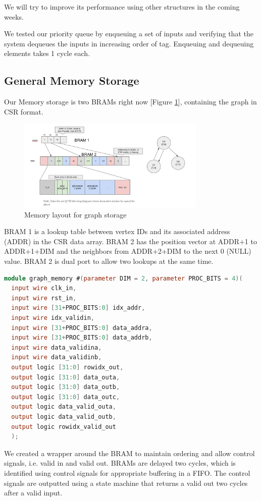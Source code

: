 \documentclass[conference]{IEEEtran}
\begin{document}
We will try to improve its performance using other structures in the coming weeks.

We tested our priority queue by enqueuing a set of inputs and verifying that the system dequeues the inputs in increasing order of tag. Enqueuing and dequeuing elements takes 1 cycle each.

\subsection{General Memory Storage}

Our Memory storage is two BRAMs right now [Figure \ref{csrfig}], containing the graph in CSR format.

\begin{figure}[htbp]
\centerline{\includegraphics[width=9cm]{csr.png}}
\caption{Memory layout for graph storage}
\label{csrfig}
\end{figure}

BRAM 1 is a lookup table between vertex IDs and its associated address (ADDR) in the CSR data array. BRAM 2 has the position vector at ADDR+1 to ADDR+1+DIM and the neighbors from ADDR+2+DIM to the next 0 (NULL) value. BRAM 2 is dual port to allow two lookups at the same time.

\begin{lstlisting}[language=Verilog]
module graph_memory #(parameter DIM = 2, parameter PROC_BITS = 4)(
  input wire clk_in,
  input wire rst_in,
  input wire [31+PROC_BITS:0] idx_addr,
  input wire idx_validin,
  input wire [31+PROC_BITS:0] data_addra,
  input wire [31+PROC_BITS:0] data_addrb,
  input wire data_validina,
  input wire data_validinb,
  output logic [31:0] rowidx_out,
  output logic [31:0] data_outa,
  output logic [31:0] data_outb,
  output logic [31:0] data_outc,
  output logic data_valid_outa,
  output logic data_valid_outb,
  output logic rowidx_valid_out
  );    
\end{lstlisting}

We created a wrapper around the BRAM to maintain ordering and allow control signals, i.e. valid in and valid out. BRAMs are delayed two cycles, which is identified using control signals for appropriate buffering in a FIFO. The control signals are outputted using a state machine that returns a valid out two cycles after a valid input.
\end{document}
